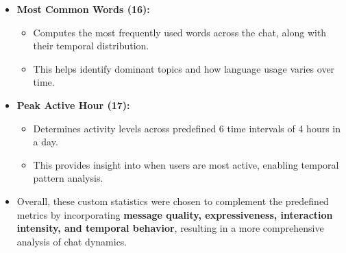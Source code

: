 \documentclass[11pt,a4paper]{article}
\begin{document}
\begin{itemize}
    \item \textbf{Most Common Words (16):}
    \begin{itemize}
        \item Computes the most frequently used words across the chat, along with their temporal distribution.
        \item This helps identify dominant topics and how language usage varies over time.
    \end{itemize}

    \item \textbf{Peak Active Hour (17):}
    \begin{itemize}
        \item Determines activity levels across predefined 6 time intervals of 4 hours in a day.
        \item This provides insight into when users are most active, enabling temporal pattern analysis.
    \end{itemize}

    \item Overall, these custom statistics were chosen to complement the predefined metrics by incorporating \textbf{message quality, expressiveness, interaction intensity, and temporal behavior}, resulting in a more comprehensive analysis of chat dynamics.
\end{itemize}
\end{document}
